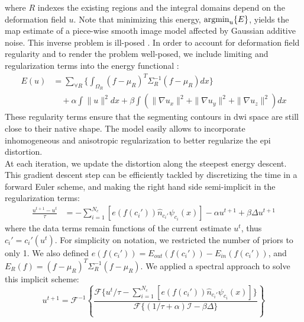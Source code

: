 where $R$ indexes the existing regions and the integral domains
depend on the deformation field $u$. Note
that minimizing this energy, $\operatorname{argmin}_u\{E\}$, yields the \gls{map} 
estimate of a piece-wise smooth image model affected by Gaussian 
additive noise. This inverse problem is ill-posed
\cite{bertero_ill-posed_1988,hadamard_sur_1902}.
In order to account for deformation field regularity and to render the 
problem well-posed, we include limiting and regularization terms into 
the energy functional \cite{morozov_linear_1975,tichonov_solution_1963}:
%
\begin{align}
\label{eq:complete_energy}
E(u) &= \sum_{\forall{R}} \lbrace \int_{\Omega_R} (f-\mu_R)^T\Sigma_R^{-1}(f-\mu_R) dx \rbrace \nonumber \\
&\quad + \alpha \int  \|u\|^2 dx + \beta \int \left( \|\nabla u_x\|^2 + \|\nabla u_y\|^2 + \|\nabla u_z\|^2\right) dx
\end{align}
%
These regularity terms ensure that the segmenting contours in 
\gls{dwi} space are still close to their native shape. The model
easily allows to incorporate inhomogeneous and anisotropic 
regularization \cite{nagel_investigation_1986} to better regularize
the \gls{epi} distortion. \\
%

At each iteration, we update the distortion along the steepest 
energy descent. This gradient descent step can be efficiently 
tackled by discretizing the time in a forward Euler scheme, 
and making the right hand side semi-implicit in the 
regularization terms:
%
\begin{align}
\frac{u^{t+1}-u^t}{\tau} &= - \sum_{i=1}^{N_c} \left[ e(f(c_i'))  \hat{n}_{c_i'} \psi_{c_i}(x) \right] -\alpha u^{t+1} + \beta\Delta u^{t+1}
\end{align}
%
where the data terms remain functions of the current estimate 
$u^t$, thus $c_i' = c_i'(u^t)$. For simplicity on notation, we 
restricted the number of priors to only 1. We also defined 
$e(f(c_i')) = E_{out}(f(c_i')) - E_{in}(f(c_i'))$, 
and $E_R(f) = {(f-\mu_R)^T\Sigma_R^{-1}(f-\mu_R)}$.
We applied a spectral approach to solve this implicit scheme:
%
\begin{equation}
u^{t+1} = \mathcal{F}^{-1}\left\{ \frac{\mathcal{F}\{u^t/\tau
- \sum_{i=1}^{N_c} \left[e(f(c_i')) \hat{n}_{c_i'} \psi_{c_i}(x) \right]  \}}{\mathcal{F}\{(1/\tau+\alpha)\mathcal{I}-\beta\Delta\}} \right\}
\end{equation}
%

